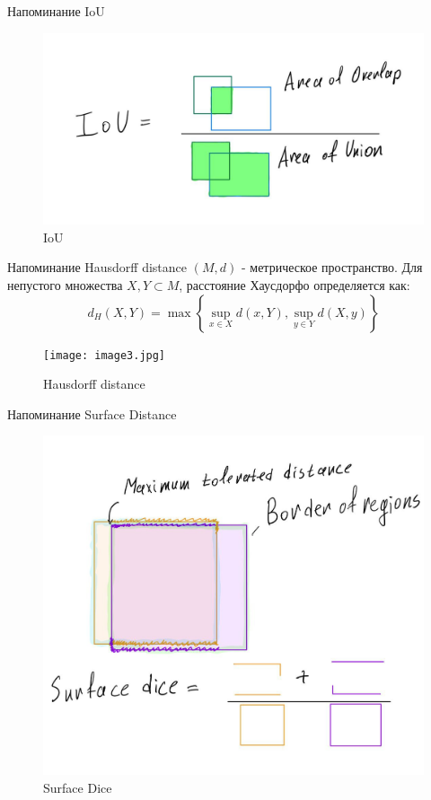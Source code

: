 \documentclass[10pt]{beamer}
\theoremstyle{definition}
\begin{document}
        \begin{frame}{Напоминание IoU}
        \begin{figure}
            \centering
            \includegraphics[width=\linewidth]{image0.jpg}
            \caption{IoU}
            \label{fig:iou-label}
        \end{figure}
        
        \end{frame}
        
        \begin{frame}{Напоминание Hausdorff distance}
        $(M, d)$ - метрическое пространство. Для непустого множества $X, Y \subset M$, расстояние Хаусдорфо определяется как:
        $$
        d_H(X, Y) = \max\left\{ \sup_{x \in X} d(x,Y), \sup_{y \in Y} d(X,y)  \right\}
        $$
        \begin{figure}
            \centering
            \texttt{[image: image3.jpg]}
            \caption{Hausdorff distance}
            \label{fig:hausdorff-label}
        \end{figure}
        \end{frame}

        \begin{frame}{Напоминание Surface Distance}
            \begin{figure}
                \centering
                \includegraphics[width=0.9\linewidth]{image2.jpg}
                \caption{Surface Dice}
                \label{fig:surface-dice-label}
            \end{figure}
        \end{frame}
        
\end{document}

